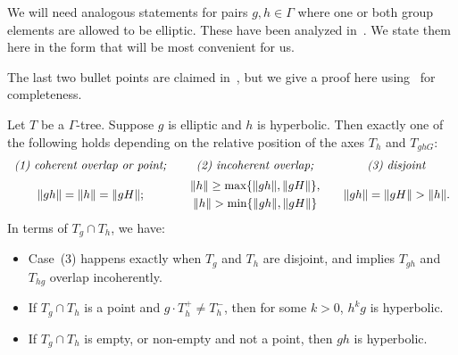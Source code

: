 We will need analogous statements for pairs $g,h \in \Gamma$ where one
or both group elements are allowed to be elliptic. These have been
analyzed in~\cite{Pa89:Paulin1989TheGT}. We state them here in the
form that will be most convenient for us. 

The last two bullet points are claimed in~\cite[Page~853]{Gui05:Coeur}, but we give a proof here using~\cite[Proposition~1.7]{Pa89:Paulin1989TheGT} for completeness.

\begin{lemma}\label{lem:pau_ell_hyp}
Let $T$ be a $\Gamma$-tree. Suppose $g$ is elliptic and $h$ is
hyperbolic. Then exactly one of the following holds depending on the
relative position of the axes $T_h$ and $T_{ghG}$:
\[ \begin{array}{c@{\qquad}c@{\qquad}c} \text{\emph{(1) coherent overlap or point;}} & \text{\emph{(2) incoherent overlap;}} & \text{\emph{(3) disjoint}} \\[1.2ex] \norm{gh}=\norm{h}=\norm{gH}; & \begin{gathered}\norm{h}\geq \max \{ \norm{gh}, \norm{gH}\}, \\ \norm{h} > \min \{ \norm{gh}, \norm{gH}\}\end{gathered} & \norm{gh}=\norm{gH}>\norm{h}. \end{array} \]
In terms of $T_g \cap T_h$, we have:
\begin{itemize}
\item Case~(3) happens exactly when $T_g$ and $T_h$ are
disjoint, and implies $T_{gh}$ and $T_{hg}$ overlap incoherently.
\item If $T_g \cap T_h$ is a point and $g \cdot T_h^+ \ne T_h^-$, then
  for some $k > 0$, $h^kg$ is hyperbolic.
\item If $T_g \cap T_h$ is empty, or non-empty and not a point, then $gh$ is hyperbolic.
\end{itemize}
\end{lemma}

